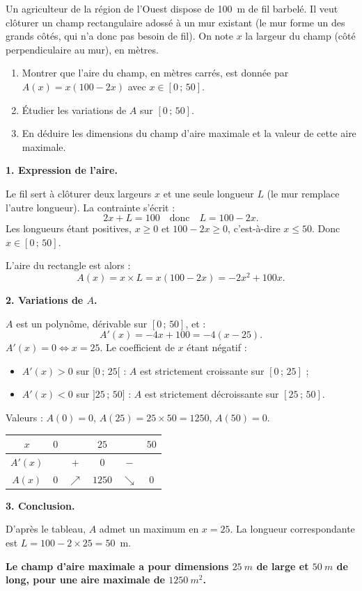 \documentclass[11pt]{article}
\begin{document}
\begin{exoresolu}
Un agriculteur de la région de l'Ouest dispose de \SI{100}{m} de fil barbelé. Il veut clôturer un champ rectangulaire adossé à un mur existant (le mur forme un des grands côtés, qui n'a donc pas besoin de fil). On note $x$ la largeur du champ (côté perpendiculaire au mur), en mètres.
\begin{enumerate}
\item Montrer que l'aire du champ, en mètres carrés, est donnée par $A(x) = x(100 - 2x)$ avec $x \in [0\,;\,50]$.
\item Étudier les variations de $A$ sur $[0\,;\,50]$.
\item En déduire les dimensions du champ d'aire maximale et la valeur de cette aire maximale.
\end{enumerate}
\tcblower
\textbf{1. Expression de l'aire.}

Le fil sert à clôturer deux largeurs $x$ et une seule longueur $L$ (le mur remplace l'autre longueur). La contrainte s'écrit :
\[ 2x + L = 100 \quad \text{donc} \quad L = 100 - 2x. \]
Les longueurs étant positives, $x \geq 0$ et $100 - 2x \geq 0$, c'est-à-dire $x \leq 50$. Donc $x \in [0\,;\,50]$.

L'aire du rectangle est alors :
\[ A(x) = x \times L = x(100 - 2x) = -2x^2 + 100x. \]

\textbf{2. Variations de $A$.}

$A$ est un polynôme, dérivable sur $[0\,;\,50]$, et :
\[ A'(x) = -4x + 100 = -4(x - 25). \]
$A'(x) = 0 \iff x = 25$. Le coefficient de $x$ étant négatif :
\begin{itemize}
\item $A'(x) > 0$ sur $[0\,;\,25[$ : $A$ est strictement croissante sur $[0\,;\,25]$ ;
\item $A'(x) < 0$ sur $]25\,;\,50]$ : $A$ est strictement décroissante sur $[25\,;\,50]$.
\end{itemize}
Valeurs : $A(0) = 0$, $A(25) = 25 \times 50 = 1250$, $A(50) = 0$.

\begin{center}
\begin{tabular}{|c|ccccc|}
\hline
$x$ & $0$ & & $25$ & & $50$ \\
\hline
$A'(x)$ & & $+$ & $0$ & $-$ & \\
\hline
$A(x)$ & $0$ & $\nearrow$ & $1250$ & $\searrow$ & $0$ \\
\hline
\end{tabular}
\end{center}

\textbf{3. Conclusion.}

D'après le tableau, $A$ admet un maximum en $x = 25$. La longueur correspondante est $L = 100 - 2\times 25 = 50$~m.

\textbf{Le champ d'aire maximale a pour dimensions $\SI{25}{m}$ de large et $\SI{50}{m}$ de long, pour une aire maximale de $\SI{1250}{m^2}$.}
\end{exoresolu}
\end{document}

